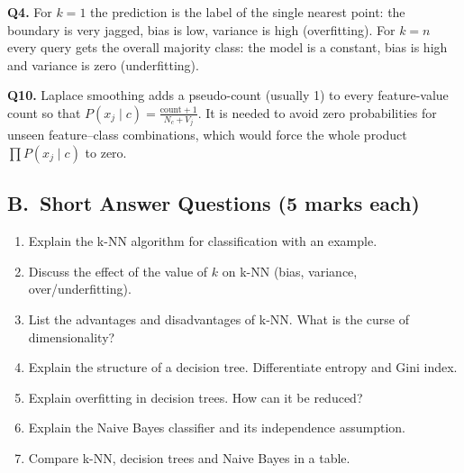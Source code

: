 \begin{modelans}[: Q4 and Q10]
\textbf{Q4.} For $k=1$ the prediction is the label of the single nearest point: the boundary is very jagged, bias is low, variance is high (overfitting). For $k=n$ every query gets the overall majority class: the model is a constant, bias is high and variance is zero (underfitting).\par
\textbf{Q10.} Laplace smoothing adds a pseudo-count (usually 1) to every feature-value count so that $P(x_j\mid c)=\frac{\text{count}+1}{N_c+V_j}$. It is needed to avoid zero probabilities for unseen feature--class combinations, which would force the whole product $\prod P(x_j\mid c)$ to zero.
\end{modelans}

\subsection*{B.\ Short Answer Questions (5 marks each)}
\begin{enumerate}
  \item Explain the k-NN algorithm for classification with an example. 
  \item Discuss the effect of the value of $k$ on k-NN (bias, variance, over/underfitting). 
  \item List the advantages and disadvantages of k-NN. What is the curse of dimensionality? 
  \item Explain the structure of a decision tree. Differentiate entropy and Gini index. 
  \item Explain overfitting in decision trees. How can it be reduced? 
  \item Explain the Naive Bayes classifier and its independence assumption. 
  \item Compare k-NN, decision trees and Naive Bayes in a table. 
\end{enumerate}

